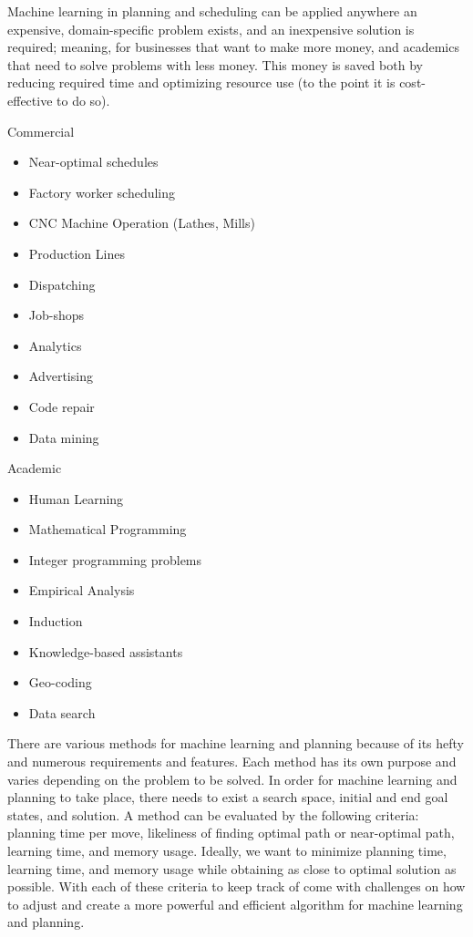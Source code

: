 \documentclass[tog]{acmsiggraph}
\begin{document}
Machine learning in planning and scheduling can be applied anywhere an expensive, domain-specific problem exists, and an inexpensive solution is required; meaning, for businesses that want to make more money, and academics that need to solve problems with less money. This money is saved both by reducing required time and optimizing resource use (to the point it is cost-effective to do so).

Commercial
\begin{itemize}  
\item Near-optimal schedules
\item Factory worker scheduling
\item CNC Machine Operation (Lathes, Mills)
\item Production Lines
\item Dispatching
\item Job-shops
\item Analytics
\item Advertising
\item Code repair
\item Data mining
\end{itemize}
Academic
\begin{itemize} 
\item Human Learning
\item Mathematical Programming
\item Integer programming problems
\item Empirical Analysis
\item Induction
\item Knowledge-based assistants
\item Geo-coding
\item Data search
\end{itemize}

There are various methods for machine learning and planning because of its hefty and numerous requirements and features. Each method has its own purpose and varies depending on the problem to be solved. In order for machine learning and planning to take place, there needs to exist a search space, initial and end goal states, and solution. A method can be evaluated by the following criteria: planning time per move, likeliness of finding optimal path or near-optimal path, learning time, and memory usage. Ideally, we want to minimize planning time, learning time, and memory usage while obtaining as close to optimal solution as possible. With each of these criteria to keep track of come with challenges on how to adjust and create a more powerful and efficient algorithm for machine learning and planning.
\end{document}
